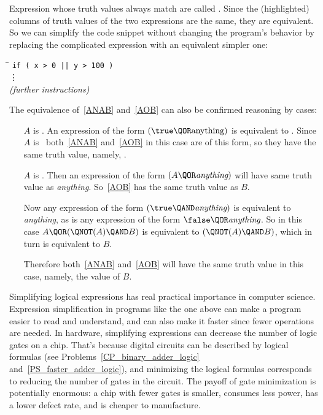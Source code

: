 Expression whose truth values always match are called .
Since the (highlighted) columns of truth values of the two expressions are
the same, they are equivalent.  So we can simplify the code snippet
without changing the program's behavior by replacing the complicated
expression with an equivalent simpler one:
%
\begin{tabbing}
\hspace{1in} \= \quad\quad \= \quad\quad \= \quad\quad \= \kill
\> \texttt{if ( x > 0 || y > 100 )} \\
\> \> \vdots\\
\> \emph{(further instructions)}
\end{tabbing}

The equivalence of~\eqref{ANAB} and~\eqref{AOB} can also be confirmed
reasoning by cases:
\begin{itemize}
\item[$A$ is \true.]  An expression of the form $(\true \QOR
  \text{anything})$ is equivalent to \true.  Since $A$ is \true\
  both~\eqref{ANAB} and~\eqref{AOB} in this case are of this form, so they
  have the same truth value, namely, \true.

\item[$A$ is \false.]  Then an expression of the form $(A \QOR
  \textit{anything})$ will have same truth value as \emph{anything}.
   So~\eqref{AOB} has the same truth value as $B$.

   Now any expression of the form $(\true \QAND \textit{anything})$ is
   equivalent to \emph{anything}, as is any expression of the form $\false
   \QOR \emph{anything}$. 
   So in this case $A \QOR (\QNOT(A) \QAND B)$ is equivalent to
   $(\QNOT(A) \QAND B)$, which in turn is equivalent to $B$.

   Therefore both~\eqref{ANAB} and~\eqref{AOB} will have the same truth
   value in this case, namely, the value of $B$.
\end{itemize}

Simplifying logical expressions has real practical importance in
computer science.  Expression simplification in programs like the one
above can make a program easier to read and understand, and can also
make it faster since fewer operations are needed.  In hardware,
simplifying expressions can decrease the number of logic gates on a
chip.  That's because digital circuits can be described by logical
formulas (see Problems~\ref{CP_binary_adder_logic}
and~\ref{PS_faster_adder_logic}), and minimizing the logical formulas
corresponds to reducing the number of gates in the circuit.  The
payoff of gate minimization is potentially enormous: a chip with fewer
gates is smaller, consumes less power, has a lower defect rate, and is
cheaper to manufacture.

